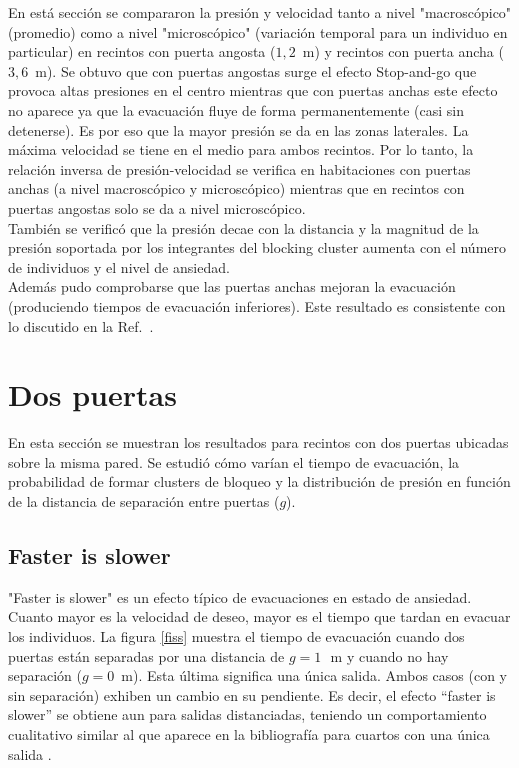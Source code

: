 En está sección se compararon la presión y velocidad tanto a nivel "macroscópico" (promedio) como a nivel "microscópico" (variación temporal para un individuo en particular) en recintos con puerta angosta ($1,2$~m) y recintos con puerta ancha ($3,6$~m). Se obtuvo que con puertas angostas surge el efecto Stop-and-go que provoca altas presiones en el centro mientras que con puertas anchas este efecto no aparece ya que la evacuación fluye de forma permanentemente (casi sin detenerse). Es por eso que la mayor presión se da en las zonas laterales. La máxima velocidad se tiene en el medio para ambos recintos. Por lo tanto, la relación inversa de presión-velocidad se verifica en habitaciones con puertas anchas (a nivel macroscópico y microscópico) mientras que en recintos con puertas angostas solo se da a nivel microscópico.\\

También se verificó que la presión decae con la distancia y la magnitud de la presión soportada por los integrantes del blocking cluster aumenta con el número de individuos y el nivel de ansiedad.\\
Además pudo comprobarse que las puertas anchas mejoran la evacuación (produciendo tiempos de evacuación inferiores). Este resultado es consistente con lo discutido en la Ref.~\cite{huanhuan1}.  

\newpage

\section{\label{dos_puertas} Dos puertas}

En esta sección se muestran los resultados para recintos con dos puertas ubicadas sobre la misma pared. Se estudió cómo varían el tiempo de evacuación, la probabilidad de formar clusters de bloqueo y la distribución de presión en función de la distancia de separación entre puertas ($g$).  

\subsection{Faster is slower}

"Faster is slower" es un efecto típico de evacuaciones en estado de ansiedad. Cuanto mayor es la velocidad de deseo, mayor es el tiempo que tardan en evacuar los individuos. 
La figura \ref{fiss} muestra el tiempo de evacuación cuando dos puertas están separadas por una distancia de $g=1\,$~m 
y cuando no hay separación ($g=0$~m). Esta última significa una única salida. Ambos casos (con y sin separación) exhiben un cambio en su pendiente. Es decir, el efecto ``faster is slower'' se obtiene aun para salidas distanciadas, teniendo un comportamiento cualitativo similar al que aparece en la bibliografía para cuartos con una única salida \cite{Helbing1,Dorso1}.\\ 

